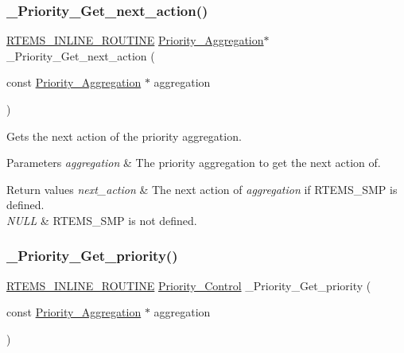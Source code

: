 \subsubsection{\texorpdfstring{\_Priority\_Get\_next\_action()}{\_Priority\_Get\_next\_action()}}
{\footnotesize\ttfamily \mbox{\hyperlink{group__RTEMSScoreBaseDefs_gac216239df231d5dbd15e3520b0b9313f}{R\+T\+E\+M\+S\+\_\+\+I\+N\+L\+I\+N\+E\+\_\+\+R\+O\+U\+T\+I\+NE}} \mbox{\hyperlink{structPriority__Aggregation}{Priority\+\_\+\+Aggregation}}$\ast$ \+\_\+\+Priority\+\_\+\+Get\+\_\+next\+\_\+action (\begin{DoxyParamCaption}\item[{const \mbox{\hyperlink{structPriority__Aggregation}{Priority\+\_\+\+Aggregation}} $\ast$}]{aggregation }\end{DoxyParamCaption})}



Gets the next action of the priority aggregation. 


\begin{DoxyParams}{Parameters}
{\em aggregation} & The priority aggregation to get the next action of.\\
\hline
\end{DoxyParams}

\begin{DoxyRetVals}{Return values}
{\em next\+\_\+action} & The next action of {\itshape aggregation} if R\+T\+E\+M\+S\+\_\+\+S\+MP is defined. \\
\hline
{\em N\+U\+LL} & R\+T\+E\+M\+S\+\_\+\+S\+MP is not defined. \\
\hline
\end{DoxyRetVals}
\mbox{\label{group__RTEMSScorePriority_gaea7676bde1276ab7042195c043e25bd5}} 
\subsubsection{\texorpdfstring{\_Priority\_Get\_priority()}{\_Priority\_Get\_priority()}}
{\footnotesize\ttfamily \mbox{\hyperlink{group__RTEMSScoreBaseDefs_gac216239df231d5dbd15e3520b0b9313f}{R\+T\+E\+M\+S\+\_\+\+I\+N\+L\+I\+N\+E\+\_\+\+R\+O\+U\+T\+I\+NE}} \mbox{\hyperlink{group__RTEMSScorePriority_ga59d02b58072d31a9a1cfe644557aefe2}{Priority\+\_\+\+Control}} \+\_\+\+Priority\+\_\+\+Get\+\_\+priority (\begin{DoxyParamCaption}\item[{const \mbox{\hyperlink{structPriority__Aggregation}{Priority\+\_\+\+Aggregation}} $\ast$}]{aggregation }\end{DoxyParamCaption})}



